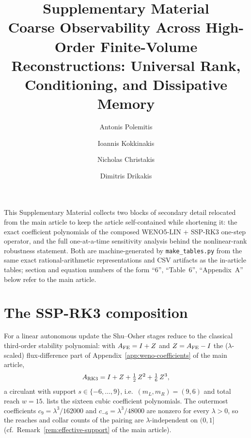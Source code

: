 \documentclass[11pt,a4paper]{article}
\title{Supplementary Material\\[2pt]
\large Coarse Observability Across High-Order Finite-Volume Reconstructions: Universal Rank, Conditioning, and Dissipative Memory}
\author{Antonis Polemitis \and Ioannis Kokkinakis \and Nicholas Christakis \and Dimitris Drikakis}
\date{}
\begin{document}
\maketitle

\noindent This Supplementary Material collects two blocks of secondary detail relocated from the main article to keep the article self-contained while shortening it: the exact coefficient polynomials of the composed WENO5-LIN + SSP-RK3 one-step operator, and the full one-at-a-time sensitivity analysis behind the nonlinear-rank robustness statement.
Both are machine-generated by \texttt{make\_tables.py} from the same exact rational-arithmetic representations and CSV artifacts as the in-article tables; section and equation numbers of the form ``6'', ``Table~6'', ``Appendix~A'' below refer to the main article.

\section{The SSP-RK3 composition}\label{app:rk3-coefficients}

For a linear autonomous update the Shu--Osher stages reduce to the classical third-order stability polynomial: with $A_{\rm FE}=I+Z$ and $Z=A_{\rm FE}-I$ the ($\lambda$-scaled) flux-difference part of Appendix~\ref{app:weno-coefficients} of the main article, \[ A_{\rm RK3} =I+Z+\tfrac12\,Z^{2}+\tfrac16\,Z^{3}, \] a circulant with support $s\in\{-6,\dots,9\}$, i.e.\ $(m_L,m_R)=(9,6)$ and total reach $w=15$.
 lists the sixteen cubic coefficient polynomials.
The outermost coefficients $c_{9}=\lambda^{3}/162000$ and $c_{-6}=\lambda^{3}/48000$ are nonzero for every $\lambda>0$, so the reaches and collar counts of the pairing are $\lambda$-independent on $(0,1]$ (cf.\ Remark~\ref{rem:effective-support} of the main article).
\end{document}
